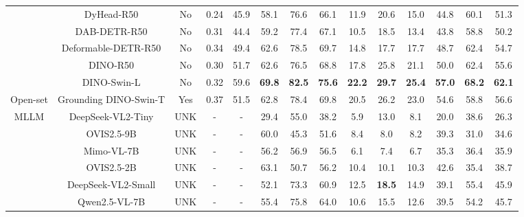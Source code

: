 \begin{table}[t]
{\begin{tabular}{cc|cc|cccccccccc}
& DyHead-R50               & No  & 0.24 & \multicolumn{1}{c|}{45.9} & 58.1 & 76.6 & \multicolumn{1}{c|}{66.1} & 11.9 & 20.6 & \multicolumn{1}{c|}{15.0} & 44.8 & 60.1 & 51.3 \\
& DAB-DETR-R50             & No  & 0.31 & \multicolumn{1}{c|}{44.4} & 59.2 & 77.4 & \multicolumn{1}{c|}{67.1} & 10.5 & 18.5 & \multicolumn{1}{c|}{13.4} & 43.8 & 58.8 & 50.2 \\
& Deformable-DETR-R50      & No  & 0.34 & \multicolumn{1}{c|}{49.4} & 62.6 & 78.5 & \multicolumn{1}{c|}{69.7} & 14.8 & 17.7 & \multicolumn{1}{c|}{17.7} & 48.7 & 62.4 & 54.7 \\
& DINO-R50                 & No  & 0.30 & \multicolumn{1}{c|}{51.7} & 62.6 & 76.5 & \multicolumn{1}{c|}{68.8} & 17.8 & 25.8 & \multicolumn{1}{c|}{21.1} & 50.0 & 62.4 & 55.6 \\
& DINO-Swin-L              & No  & 0.32 & \multicolumn{1}{c|}{59.6} & \textbf{69.8} & \textbf{82.5} & \multicolumn{1}{c|}{\textbf{75.6}} & \textbf{22.2} & \textbf{29.7} & \multicolumn{1}{c|}{\textbf{25.4}} & \textbf{57.0} & \textbf{68.2} & \textbf{62.1} \\
\midrule
Open-set & Grounding DINO-Swin-T & Yes & 0.37 & \multicolumn{1}{c|}{51.5} & 62.8 & 78.4 & \multicolumn{1}{c|}{69.8} & 20.5 & 26.2 & \multicolumn{1}{c|}{23.0} & 54.6 & 58.8 & 56.6 \\
\midrule
\multirow{10}{*}{MLLM}
& DeepSeek-VL2-Tiny         & UNK & - & \multicolumn{1}{c|}{-} & 29.4 & 55.0 & \multicolumn{1}{c|}{38.2} & 5.9  & 13.0 & \multicolumn{1}{c|}{8.1}  & 20.0 & 38.6 & 26.3 \\
& OVIS2.5-9B                & UNK & - & \multicolumn{1}{c|}{-} & 60.0 & 45.3 & \multicolumn{1}{c|}{51.6} & 8.4  & 8.0  & \multicolumn{1}{c|}{8.2}  & 39.3 & 31.0 & 34.6 \\
& Mimo-VL-7B                & UNK & - & \multicolumn{1}{c|}{-} & 56.2 & 56.9 & \multicolumn{1}{c|}{56.5} & 6.1  & 7.4  & \multicolumn{1}{c|}{6.7}  & 35.3 & 36.4 & 35.9 \\
& OVIS2.5-2B                & UNK & - & \multicolumn{1}{c|}{-} & 63.1 & 50.7 & \multicolumn{1}{c|}{56.2} & 10.4 & 10.1 & \multicolumn{1}{c|}{10.3} & 42.6 & 35.4 & 38.7 \\
& DeepSeek-VL2-Small        & UNK & - & \multicolumn{1}{c|}{-} & 52.1 & 73.3 & \multicolumn{1}{c|}{60.9} & 12.5 & \textbf{18.5} & \multicolumn{1}{c|}{14.9} & 39.1 & 55.4 & 45.9 \\
& Qwen2.5-VL-7B             & UNK & - & \multicolumn{1}{c|}{-} & 55.4 & 75.8 & \multicolumn{1}{c|}{64.0} & 10.6 & 15.5 & \multicolumn{1}{c|}{12.6} & 39.5 & 54.2 & 45.7 \\

\end{tabular}}
\end{table}
